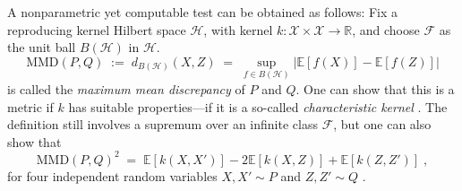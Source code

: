 \documentclass{article}
\begin{document}
A nonparametric yet computable test
can be obtained as follows: Fix a reproducing kernel
Hilbert space $\mathcal{H}$, with kernel
${k:\mathcal{X}\times\mathcal{X}\rightarrow\mathbb{R}}$, and 
choose $\mathcal{F}$ as the unit ball ${B(\mathcal{H})}$ in $\mathcal{H}$.
\begin{equation*}
  \mathrm{MMD}(P,Q)
  \;:=\;
  d_{B(\mathcal{H})}(X,Z)
  \;=\;
  \sup_{f\in B(\mathcal{H})}|\mathbb{E}[f(X)]-\mathbb{E}[f(Z)]|
\end{equation*}
is called the \emph{maximum mean discrepancy} of $P$ and $Q$.
One can show that this is a metric if $k$ has suitable properties---if it is a
so-called \emph{characteristic kernel} \citep{fukumizu_kernel_2007}. 
The definition still involves a supremum over an infinite class
$\mathcal{F}$, but one can also show that
\begin{equation}
  \mathrm{MMD}(P,Q)^2\;=\;\mathbb{E}[k(X,X')]-2\mathbb{E}[k(X,Z)]+\mathbb{E}[k(Z,Z')]\;,\label{eq:mmd2}
\end{equation}
for four independent random variables ${X,X'\sim P}$ and ${Z,Z'\sim
  Q}$ \cite{gretton_kernel_2012}.
  
\end{document}
